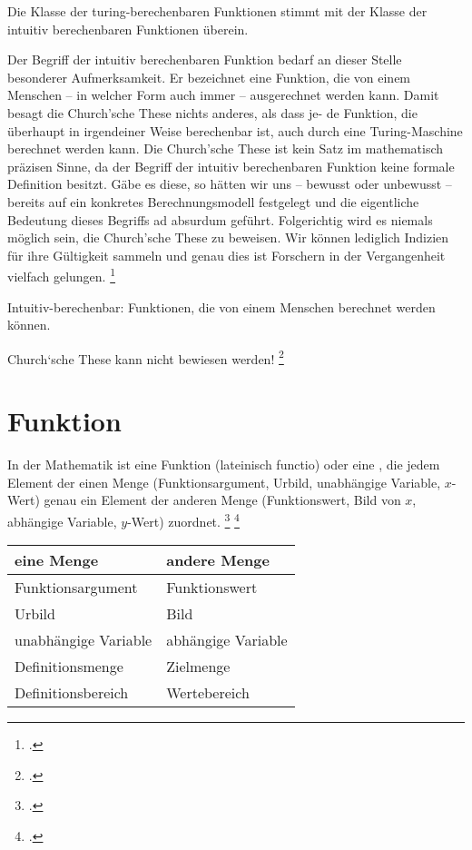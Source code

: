 \documentclass{lehramt-informatik-haupt}
\begin{document}
Die Klasse der turing-berechenbaren Funktionen stimmt mit der
Klasse der intuitiv berechenbaren Funktionen überein.

Der Begriff der intuitiv berechenbaren Funktion bedarf an dieser Stelle
besonderer Aufmerksamkeit. Er bezeichnet eine Funktion, die von einem
Menschen – in welcher Form auch immer – ausgerechnet werden kann. Damit
besagt die Church’sche These nichts anderes, als dass je- de Funktion,
die überhaupt in irgendeiner Weise berechenbar ist, auch durch eine
Turing-Maschine berechnet werden kann. Die Church’sche These ist kein
Satz im mathematisch präzisen Sinne, da der Begriff der intuitiv
berechenbaren Funktion keine formale Definition besitzt. Gäbe es
diese, so hätten wir uns – bewusst oder unbewusst – bereits auf ein
konkretes Berechnungsmodell festgelegt und die eigentliche Bedeutung
dieses Begriffs ad absurdum geführt. Folgerichtig wird es niemals
möglich sein, die Church’sche These zu beweisen. Wir können lediglich
Indizien für ihre Gültigkeit sammeln und genau dies ist Forschern in der
Vergangenheit vielfach gelungen.
\footcite[Seite 308]{hoffmann}

Intuitiv-berechenbar:
Funktionen, die von einem Menschen berechnet werden können.

Church‘sche These kann nicht bewiesen werden!
\footcite[Seite 27]{theo:fs:4}

\section{Funktion}

In der Mathematik ist eine Funktion (lateinisch functio) oder
 eine , die jedem Element der einen Menge (Funktionsargument, Urbild,
unabhängige Variable, $x$-Wert) genau ein Element der anderen Menge
(Funktionswert, Bild von $x$, abhängige Variable, $y$-Wert) zuordnet.
\footcite[Seite 51]{hoffmann}
\footcite{wiki:funktion}

\begin{center}
\begin{tabular}{l|l}
eine Menge & andere Menge\\\hline
Funktionsargument & Funktionswert\\
Urbild & Bild\\
unabhängige Variable & abhängige Variable\\
Definitionsmenge & Zielmenge\\
Definitionsbereich & Wertebereich\\
\end{tabular}
\end{center}
\end{document}
